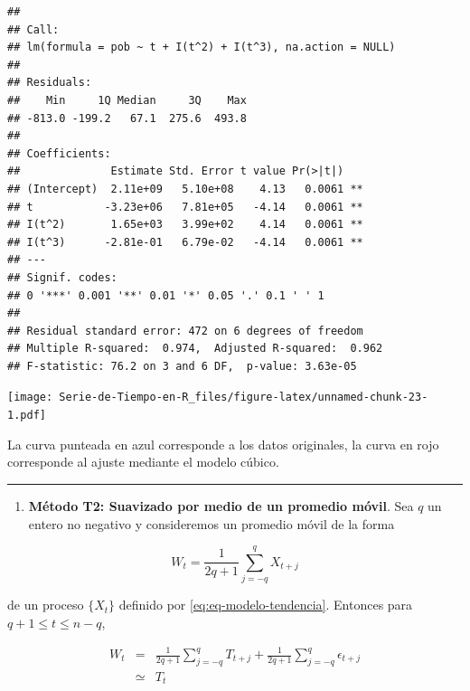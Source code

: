 \documentclass[12pt,]{krantz}
\makeatletter
\newenvironment{Shaded}{\begin{snugshade}}{\end{snugshade}}
\newcommand{\KeywordTok}[1]{\textcolor[rgb]{0.13,0.29,0.53}{\textbf{#1}}}
\newcommand{\DataTypeTok}[1]{\textcolor[rgb]{0.13,0.29,0.53}{#1}}
\newcommand{\StringTok}[1]{\textcolor[rgb]{0.31,0.60,0.02}{#1}}
\newcommand{\OperatorTok}[1]{\textcolor[rgb]{0.81,0.36,0.00}{\textbf{#1}}}
\newcommand{\NormalTok}[1]{#1}
\providecommand{\tightlist}{%
  \setlength{\itemsep}{0pt}\setlength{\parskip}{0pt}}
\newenvironment{kframe}{%
\medskip{}
\setlength{\fboxsep}{.8em}
 \def\at@end@of@kframe{}%
 \ifinner\ifhmode%
  \def\at@end@of@kframe{\end{minipage}}%
  \begin{minipage}{\columnwidth}%
 \fi\fi%
 \def\FrameCommand##1{\hskip\@totalleftmargin \hskip-\fboxsep
 \colorbox{shadecolor}{##1}\hskip-\fboxsep
     \hskip-\linewidth \hskip-\@totalleftmargin \hskip\columnwidth}%
 \MakeFramed {\advance\hsize-\width
   \@totalleftmargin\z@ \linewidth\hsize
   \@setminipage}}%
 {\par\unskip\endMakeFramed%
 \at@end@of@kframe}
\renewenvironment{Shaded}{\begin{kframe}}{\end{kframe}}
\theoremstyle{definition}
\theoremstyle{definition}
\theoremstyle{definition}
\theoremstyle{remark}
\makeatother
\begin{document}
\begin{verbatim}
## 
## Call:
## lm(formula = pob ~ t + I(t^2) + I(t^3), na.action = NULL)
## 
## Residuals:
##    Min     1Q Median     3Q    Max 
## -813.0 -199.2   67.1  275.6  493.8 
## 
## Coefficients:
##              Estimate Std. Error t value Pr(>|t|)   
## (Intercept)  2.11e+09   5.10e+08    4.13   0.0061 **
## t           -3.23e+06   7.81e+05   -4.14   0.0061 **
## I(t^2)       1.65e+03   3.99e+02    4.14   0.0061 **
## I(t^3)      -2.81e-01   6.79e-02   -4.14   0.0061 **
## ---
## Signif. codes:  
## 0 '***' 0.001 '**' 0.01 '*' 0.05 '.' 0.1 ' ' 1
## 
## Residual standard error: 472 on 6 degrees of freedom
## Multiple R-squared:  0.974,  Adjusted R-squared:  0.962 
## F-statistic: 76.2 on 3 and 6 DF,  p-value: 3.63e-05
\end{verbatim}

\begin{Shaded}
\end{Shaded}

\texttt{[image: Serie-de-Tiempo-en-R\_files/figure-latex/unnamed-chunk-23-1.pdf]}

La curva punteada en azul corresponde a los datos originales, la curva
en rojo corresponde al ajuste mediante el modelo cúbico.

\begin{center}\rule{0.5\linewidth}{\linethickness}\end{center}

\begin{enumerate}
\def\labelenumi{\arabic{enumi}.}
\setcounter{enumi}{1}
\tightlist
\item
  \textbf{Método T2: Suavizado por medio de un promedio móvil}. Sea
  \(q\) un entero no negativo y consideremos un promedio móvil de la
  forma
\end{enumerate}

\begin{equation}
W_t = \frac{1}{2q+1}\sum_{j=-q}^{q}X_{t+j}
\label{eq:eq-promedio-movil-orden-q}
\end{equation}

de un proceso \(\{X_t\}\) definido por \eqref{eq:eq-modelo-tendencia}.
Entonces para \(q+1\leq t\leq n-q\),

\begin{eqnarray}
W_t &=& \frac{1}{2q+1}\sum_{j=-q}^qT_{t+j}+\frac{1}{2q+1}\sum_{j=-q}^q\epsilon_{t+j}\\ \nonumber
    &\simeq& T_t \label{eq:eq-media-promedio-movil}
\end{eqnarray}
\end{document}
